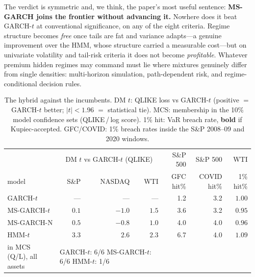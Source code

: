 \documentclass[11pt]{article}
\begin{document}
The verdict is symmetric and, we think, the paper's most useful sentence:
\textbf{MS-GARCH joins the frontier without advancing it.} Nowhere does it
beat GARCH-$t$ at conventional significance, on any of the eight criteria.
Regime structure becomes \emph{free} once tails are fat and variance
adapts---a genuine improvement over the HMM, whose structure carried a
measurable cost---but on univariate volatility and tail-risk criteria it
does not become \emph{profitable}. Whatever premium hidden regimes may
command must lie where mixtures genuinely differ from single densities:
multi-horizon simulation, path-dependent risk, and regime-conditional
decision rules.

\begin{table}[t]
\centering
\caption{The hybrid against the incumbents. DM $t$: QLIKE loss vs
GARCH-$t$ (positive $=$ GARCH-$t$ better; $|t|<1.96$ $=$ statistical tie).
MCS: membership in the 10\% model confidence sets (QLIKE\,/\,log score).
1\% hit: VaR breach rate, \textbf{bold} if Kupiec-accepted. GFC/COVID:
1\% breach rates inside the S\&P 2008--09 and 2020 windows.}
\label{tab:hybrid}
\begin{tabular}{lrrrrrr}
\toprule
& \multicolumn{3}{c}{DM $t$ vs GARCH-$t$ (QLIKE)} & S\&P 500 & S\&P 500 & WTI \\
model & S\&P & NASDAQ & WTI & GFC hit\% & COVID hit\% & 1\% hit\% \\
\midrule
GARCH-$t$    & ---    & ---    & ---   & 1.2 & 3.2 & $\mathbf{1.00}$ \\
MS-GARCH-$t$ & $0.1$  & $-1.0$ & $1.5$ & 3.6 & 3.2 & $\mathbf{0.95}$ \\
MS-GARCH-N   & $0.5$  & $-0.8$ & $1.0$ & 4.0 & 4.0 & $\mathbf{0.96}$ \\
HMM-$t$      & $3.3$  & $2.6$  & $2.3$ & 6.7 & 4.0 & $\mathbf{1.09}$ \\
\midrule
in MCS (Q/L), all assets & \multicolumn{3}{l}{GARCH-$t$: 6/6 \quad
MS-GARCH-$t$: 6/6 \quad HMM-$t$: 1/6} & & & \\
\bottomrule
\end{tabular}
\end{table}
\end{document}
